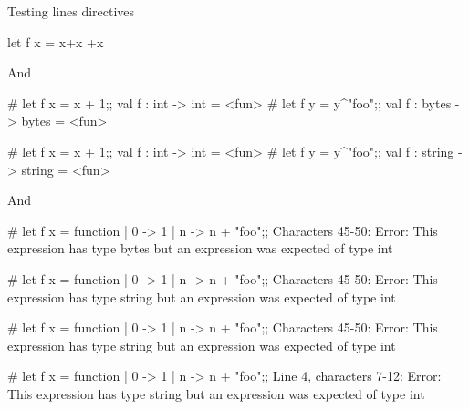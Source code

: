 Testing lines directives

\begin{ocaml}
let f x =
  x+x
  +x
\end{ocaml}

And

\begin{ocaml}
# let f x = x + 1;;
val f : int -> int = <fun>
# let f y =
  y^"foo";;
val f : bytes -> bytes = <fun>
\end{ocaml}

\begin{ocaml}
# let f x = x + 1;;
val f : int -> int = <fun>
# let f y =
  y^"foo";;
val f : string -> string = <fun>
\end{ocaml}

And

\begin{ocaml}
# let f x = function
  | 0 -> 1
  | n ->
  n + "foo";;
Characters 45-50:
Error: This expression has type bytes but an expression was expected of type
         int
\end{ocaml}

\begin{ocaml}
# let f x = function
  | 0 -> 1
  | n ->
  n + "foo";;
Characters 45-50:
Error: This expression has type string but an expression was expected of type
         int
\end{ocaml}

\begin{ocaml}
# let f x = function
  | 0 -> 1
  | n ->
  n + "foo";;
Characters 45-50:
Error: This expression has type string but an expression was expected of type
         int
\end{ocaml}

\begin{ocaml}
# let f x = function
  | 0 -> 1
  | n ->
  n + "foo";;
Line 4, characters 7-12:
Error: This expression has type string but an expression was expected of type
         int
\end{ocaml}
